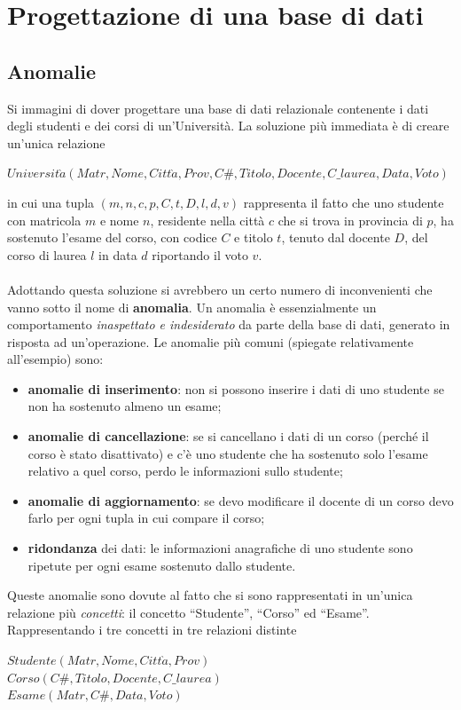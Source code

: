 \section{Progettazione di una base di dati}
\subsection{Anomalie}
Si immagini di dover progettare una base di dati relazionale contenente i dati degli 
studenti e dei corsi di un'Università. La soluzione più immediata è di creare un'unica
relazione
\begin{center}
  $Universit\grave{a}(Matr, Nome, Citt\grave{a}, Prov, C\#, Titolo, Docente, C\_laurea,
  Data, Voto)$ 
\end{center}

in cui una tupla $(m, n, c, p, C, t, D, l, d, v)$ rappresenta il fatto che uno studente
con matricola $m$ e nome $n$, residente nella città $c$ che si trova in provincia di $p$,
ha sostenuto l'esame del corso, con codice $C$ e titolo $t$, tenuto dal docente $D$, del 
corso di laurea $l$ in data $d$ riportando il voto $v$.\\\\
Adottando questa soluzione si avrebbero un certo numero di inconvenienti che vanno sotto 
il nome di \textbf{anomalia}. Un anomalia è essenzialmente un comportamento \emph{inaspettato
e indesiderato} da parte della base di dati, generato in risposta ad un'operazione. Le anomalie 
più comuni (spiegate relativamente all'esempio) sono:
\begin{itemize}
 \item \textbf{anomalie di inserimento}: non si possono inserire i dati di uno studente 
 se non ha sostenuto almeno un esame;
 \item \textbf{anomalie di cancellazione}: se si cancellano i dati di un corso (perché il
 corso è stato disattivato) e c'è uno studente che ha sostenuto solo l'esame relativo a 
 quel corso, perdo le informazioni sullo studente;
 \item \textbf{anomalie di aggiornamento}: se devo modificare il docente di un corso devo 
 farlo per ogni tupla in cui compare il corso;
 \item \textbf{ridondanza} dei dati: le informazioni anagrafiche di uno studente sono
  ripetute per ogni esame sostenuto dallo studente.
\end{itemize}
Queste anomalie sono dovute al fatto che si sono rappresentati in un'unica relazione più 
\emph{concetti}: il concetto ``Studente'', ``Corso'' ed ``Esame''. Rappresentando i tre 
concetti in tre relazioni distinte
\begin{center}
  $Studente(Matr, Nome, Citt\grave{a}, Prov)$\\
  $Corso(C\#, Titolo, Docente, C\_laurea)$\\
  $Esame(Matr, C\#, Data, Voto)$
\end{center}

